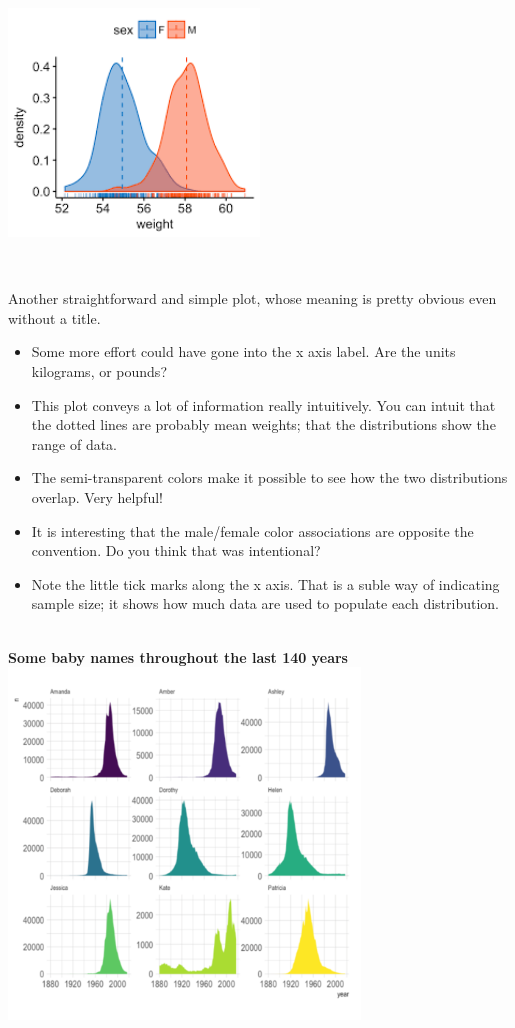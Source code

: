 \documentclass[]{book}
\providecommand{\tightlist}{%
  \setlength{\itemsep}{0pt}\setlength{\parskip}{0pt}}
\begin{document}
~\\

\includegraphics[width=0.5\textwidth,height=\textheight]{img/visf.png}

~

Another straightforward and simple plot, whose meaning is pretty obvious even without a title.

\begin{itemize}
\tightlist
\item
  Some more effort could have gone into the x axis label. Are the units kilograms, or pounds?
\item
  This plot conveys a lot of information really intuitively. You can intuit that the dotted lines are probably mean weights; that the distributions show the range of data.\\
\item
  The semi-transparent colors make it possible to see how the two distributions overlap. Very helpful!
\item
  It is interesting that the male/female color associations are opposite the convention. Do you think that was intentional?\\
\item
  Note the little tick marks along the x axis. That is a suble way of indicating sample size; it shows how much data are used to populate each distribution.
\end{itemize}

~\\

\textbf{Some baby names throughout the last 140 years}
\includegraphics[width=0.7\textwidth,height=\textheight]{img/visg.png}
\end{document}
